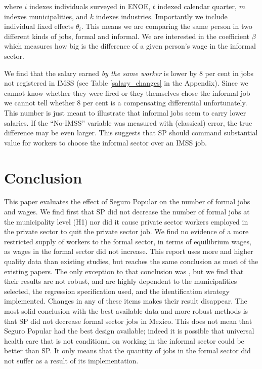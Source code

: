 \documentclass[oneside,11pt]{article}
\begin{document}
\noindent where $i$ indexes individuals surveyed in ENOE, $t$ indexed calendar quarter, $m$ indexes municipalities, and $k$ indexes industries. Importantly we include individual fixed effects $\theta_i$. This means we are comparing the same person in two different kinds of jobs, formal and informal. We are interested in the coefficient $\beta$ which measures how big is the difference of a given person's wage in the informal sector.

We find that the salary earned \textit{by the same worker} is lower by 8 per cent in jobs not registered in IMSS (see Table \ref{salary_changes} in the Appendix). Since we cannot know whether they were fired or they themselves chose the informal job we cannot tell whether 8 per cent is a compensating differential unfortunately. This number is just meant to illustrate that informal jobs seem to carry lower salaries. If the ``No-IMSS'' variable was measured with (classical) error, the true difference may be even larger. This suggests that SP should command substantial value for workers to choose the informal sector over an IMSS job. 









\section{Conclusion} \label{conclusion}

This paper evaluates the effect of Seguro Popular on the number of formal jobs and wages. We find first that SP did not decrease the number of formal jobs at the municipality level (H1) nor did it cause private sector workers employed in the private sector to quit the private sector job. We find no evidence of a more restricted supply of workers to the formal sector, in terms of equilibrium wages, as wages in the formal sector did not increase. This report uses more and higher quality data than existing studies, but reaches the same conclusion as most of the existing papers. The only exception to that conclusion was \cite{Campos}, but we find that their results are not robust, and are highly dependent to the municipalities selected, the regression specification used, and the identification strategy implemented. Changes in any of these items makes their result disappear. The most solid conclusion with the best available data and more robust methods is that SP did not decrease formal sector jobs in Mexico.  This does not mean that Seguro Popular had the best design available; indeed it is possible that universal health care that is not conditional on working in the informal sector could be better than SP. It only means that the quantity of jobs in the formal sector did not suffer as a result of its implementation.
\end{document}
